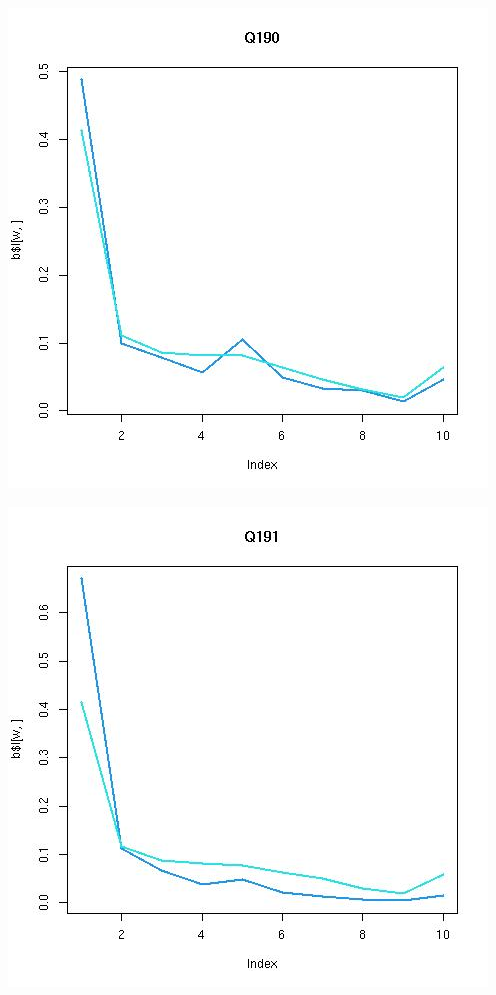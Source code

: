 \documentclass{amsart}
\begin{document}
\includegraphics[scale=0.6]{fitQ190.jpeg}

\includegraphics[scale=0.6]{fitQ191.jpeg}
\end{document}
